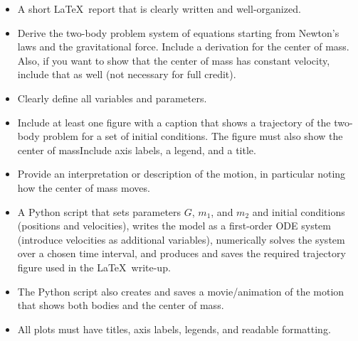 \documentclass[article, 11pt]{article}
\begin{document}
\vspace{-.26cm}
\noindent \hrulefill

\begin{itemize}
\item A short \LaTeX\, report that is clearly written and well-organized.
\item Derive the two-body problem system of equations starting from Newton's laws and the gravitational force.  Include a derivation for the center of mass.  Also, if you want to show that the center of mass has constant velocity, include that as well (not necessary for full credit). 
\item Clearly define all variables and parameters.
\item Include at least one figure with a caption that shows a trajectory of the two-body problem for a set of initial conditions.   The figure must also show the center of massInclude axis labels, a legend, and a title.
\item Provide an interpretation or description of the motion, in particular noting how the center of mass moves. 
\end{itemize}

\vspace{.35cm}

\noindent {}

\vspace{-.35cm}
\noindent \hrulefill

\begin{itemize}
\item A Python script that sets parameters $G$, $m_1$, and $m_2$ and initial conditions (positions and velocities), writes the model as a first-order ODE system (introduce velocities as additional variables), numerically solves the system over a chosen time interval, and produces and saves the required trajectory figure used in the \LaTeX\ write-up.
  
\item The Python script also creates and saves a movie/animation of the motion that shows both bodies and the center of mass. 
\item All plots must have titles, axis labels, legends, and readable formatting.

\end{itemize}

\vspace{.35cm}

\noindent {}
\end{document}
